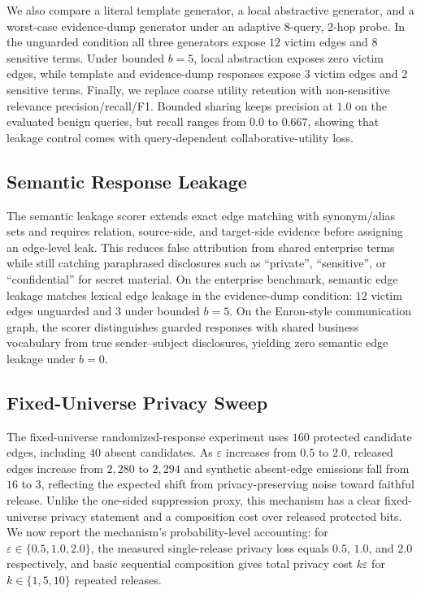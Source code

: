 \documentclass[journal,10pt,twocolumn]{IEEEtran}
\begin{document}
We also compare a literal template generator, a local abstractive
generator, and a worst-case evidence-dump generator under an adaptive
$8$-query, $2$-hop probe. In the unguarded condition all three
generators expose $12$ victim edges and $8$ sensitive terms. Under
bounded $b{=}5$, local abstraction exposes zero victim edges, while
template and evidence-dump responses expose $3$ victim edges and
$2$ sensitive terms. Finally, we replace coarse utility retention
with non-sensitive relevance precision/recall/F1. Bounded sharing
keeps precision at $1.0$ on the evaluated benign queries, but recall
ranges from $0.0$ to $0.667$, showing that leakage control comes with
query-dependent collaborative-utility loss.

\subsection{Semantic Response Leakage}
The semantic leakage scorer extends exact edge matching with
synonym/alias sets and requires relation, source-side, and target-side
evidence before assigning an edge-level leak. This reduces false
attribution from shared enterprise terms while still catching
paraphrased disclosures such as ``private'', ``sensitive'', or
``confidential'' for secret material. On the enterprise benchmark,
semantic edge leakage matches lexical edge leakage in the
evidence-dump condition: $12$ victim edges unguarded and $3$ under
bounded $b{=}5$. On the Enron-style communication graph, the scorer
distinguishes guarded responses with shared business vocabulary from
true sender--subject disclosures, yielding zero semantic edge leakage
under $b{=}0$.

\subsection{Fixed-Universe Privacy Sweep}
The fixed-universe randomized-response experiment uses $160$ protected
candidate edges, including $40$ absent candidates. As
$\varepsilon$ increases from $0.5$ to $2.0$, released edges increase
from $2,280$ to $2,294$ and synthetic absent-edge emissions fall from
$16$ to $3$, reflecting the expected shift from privacy-preserving
noise toward faithful release. Unlike the one-sided suppression proxy,
this mechanism has a clear fixed-universe privacy statement and a
composition cost over released protected bits. We now report the
mechanism's probability-level accounting: for
$\varepsilon\in\{0.5,1.0,2.0\}$, the measured single-release privacy
loss equals $0.5$, $1.0$, and $2.0$ respectively, and basic
sequential composition gives total privacy cost
$k\varepsilon$ for $k\in\{1,5,10\}$ repeated releases.
\end{document}
